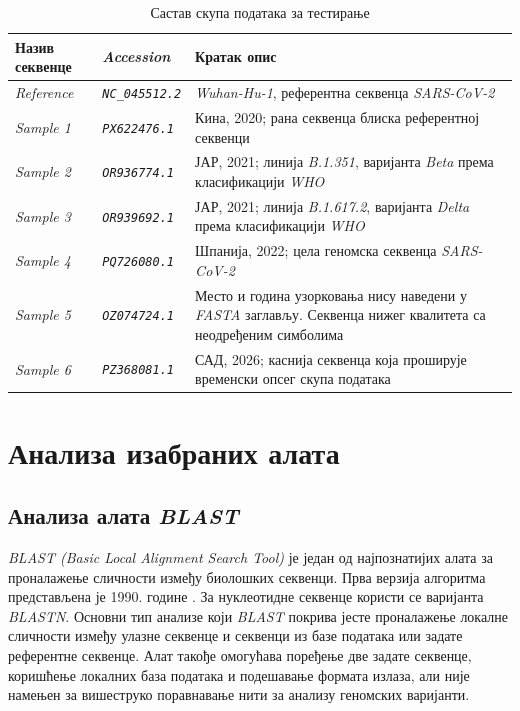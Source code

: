 \documentclass[12pt,oneside]{memoir}
\begin{document}
\begin{table}[htbp]
\centering
\small
\caption{Састав скупа података за тестирање}
\label{tab:skup-podataka-za-testiranje}

\begin{tabularx}{\textwidth}{|p{}|p{}|Y|}
\hline
\textbf{Назив секвенце} & \textbf{\textit{Accession}} & \textbf{Кратак опис} \\
\hline

\textit{Reference} &
\texttt{\textit{NC\_045512.2}} &
\textit{Wuhan-Hu-1}, референтна секвенца \textit{SARS-CoV-2} \\
\hline

\textit{Sample 1} &
\texttt{\textit{PX622476.1}} &
Кина, 2020; рана секвенца блиска референтној секвенци \\
\hline

\textit{Sample 2} &
\texttt{\textit{OR936774.1}} &
ЈАР, 2021; линија \textit{B.1.351}, варијанта \textit{Beta} према класификацији \textit{WHO} \\
\hline

\textit{Sample 3} &
\texttt{\textit{OR939692.1}} &
ЈАР, 2021; линија \textit{B.1.617.2}, варијанта \textit{Delta} према класификацији \textit{WHO} \\
\hline

\textit{Sample 4} &
\texttt{\textit{PQ726080.1}} &
Шпанија, 2022; цела геномска секвенца \textit{SARS-CoV-2} \\
\hline

\textit{Sample 5} &
\texttt{\textit{OZ074724.1}} &
Место и година узорковања нису наведени у \textit{FASTA} заглављу. Секвенца нижег квалитета са неодређеним симболима \\
\hline

\textit{Sample 6} &
\texttt{\textit{PZ368081.1}} &
САД, 2026; каснија секвенца која проширује временски опсег скупа података \\
\hline

\end{tabularx}
\end{table}

\section{Анализа изабраних алата}
\subsection{Анализа алата \textit{BLAST}}
\textit{BLAST (Basic Local Alignment Search Tool)} је један од најпознатијих алата за проналажење сличности између биолошких секвенци. Прва верзија алгоритма представљена је 1990. године \cite{altschul1990blast}. За нуклеотидне секвенце користи се варијанта \textit{BLASTN}. Основни тип анализе који \textit{BLAST} покрива јесте проналажење локалне сличности између улазне секвенце и секвенци из базе података или задате референтне секвенце. Алат такође омогућава поређење две задате секвенце, коришћење локалних база података и подешавање формата излаза, али није намењен за вишеструко поравнавање нити за анализу геномских варијанти.
\end{document}
